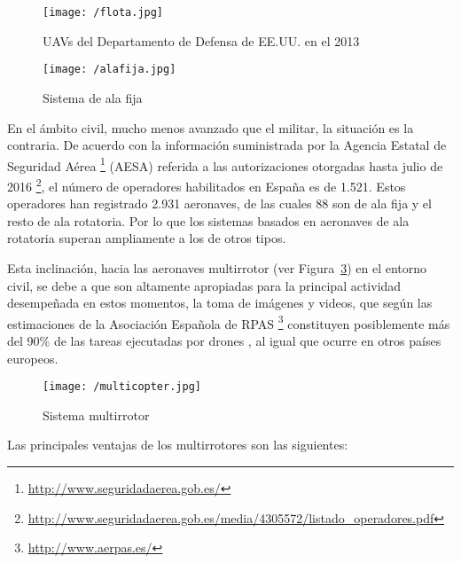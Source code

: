 \begin{figure}[!h]
\begin{center}
\texttt{[image: /flota.jpg]}
\caption[\acs{UAV}s del Departamento de Defensa de EE.UU. en el 2013]{\acs{UAV}s del Departamento de Defensa de EE.UU. en el 2013 \cite{ambitocivil2}}
\label{fig:flota}
\end{center}
\end{figure}

\begin{figure}[!h]
\begin{center}
\texttt{[image: /alafija.jpg]}
\caption[Sistema de ala fija]{Sistema de ala fija}
\label{fig:alafija}
\end{center}
\end{figure}

En el ámbito civil, mucho menos avanzado que el militar, la situación es la contraria. De acuerdo con la información suministrada por la Agencia Estatal de Seguridad Aérea \footnote{\url{http://www.seguridadaerea.gob.es/}} (AESA) referida a las autorizaciones otorgadas hasta julio de 2016 \footnote{\url{http://www.seguridadaerea.gob.es/media/4305572/listado_operadores.pdf}}, el número de operadores habilitados en España es de 1.521. Estos operadores han registrado 2.931 aeronaves, de las cuales 88 son de ala fija y el resto de ala rotatoria. Por lo que los sistemas basados en aeronaves de ala rotatoria superan ampliamente a los de otros tipos.

\clearpage

Esta inclinación, hacia las aeronaves multirrotor (ver Figura~\ref{fig:multirrotor}) en el entorno civil, se debe a que son altamente apropiadas para la principal actividad desempeñada en estos momentos, la toma de imágenes y videos, que según las estimaciones de la Asociación Española de RPAS \footnote{\url{http://www.aerpas.es/}} constituyen posiblemente más del 90\% de las tareas ejecutadas por drones \cite{AERPAS}, al igual que ocurre en otros países europeos.

\begin{figure}[!h]
\begin{center}
\texttt{[image: /multicopter.jpg]}
\caption[Sistema multirrotor]{Sistema multirrotor}
\label{fig:multirrotor}
\end{center}
\end{figure}

Las principales ventajas de los multirrotores son las siguientes:

